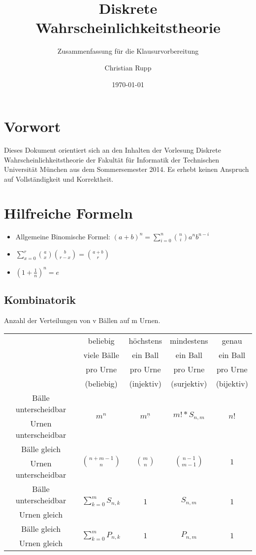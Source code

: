 \documentclass[a4,12pt]{scrartcl}
\title{Diskrete Wahrscheinlichkeitstheorie}
\subtitle{Zusammenfassung für die Klausurvorbereitung}
\author{Christian Rupp}
\date{\today}
\begin{document}
\maketitle

\newpage

\tableofcontents

\section{Vorwort}

Dieses Dokument orientiert sich an den Inhalten der Vorlesung Diskrete Wahrscheinlichkeitstheorie der Fakultät für Informatik der Technischen Universität München aus dem Sommersemester 2014.
Es erhebt keinen Anspruch auf Vollständigkeit und Korrektheit.

\section{Hilfreiche Formeln}

\begin{itemize}
\item Allgemeine Binomische Formel: $(a+b)^n=\sum^n_{i=0}\binom {n}{i}a^nb^{n-i}$
\item $\sum^r_{x=0}\binom{a}{x}\binom{b}{r-x}=\binom{a+b}{r}$
\item $\left(1+\frac{1}{n}\right)^n=e$
\end{itemize}

\subsection{Kombinatorik}
Anzahl der Verteilungen von v Bällen auf m Urnen.\\
\begin{tabular}{|c||c|c|c|c|}
\hline
&beliebig &höchstens &mindestens&genau\\
&viele Bälle&ein Ball& ein Ball& ein Ball\\
& pro Urne& pro Urne& pro Urne& pro Urne\\
& (beliebig)& (injektiv) & (surjektiv)& (bijektiv)\\
\hline
\hline
Bälle unterscheidbar& \multirow{2}{*}{$m^n$} &\multirow{2}{*}{$m^\underline{n}$} &\multirow{2}{*}{$m!*S_{n,m}$} &\multirow{2}{*}{$n!$}\\
Urnen unterscheidbar &&&&\\
\hline
Bälle gleich& \multirow{2}{*}{$\binom{n+m-1}{n}$} &\multirow{2}{*}{$\binom{m}{n}$} &\multirow{2}{*}{$\binom{n-1}{m-1}$} &\multirow{2}{*}{$1$}\\
Urnen unterscheidbar &&&&\\
\hline
Bälle unterscheidbar& \multirow{2}{*}{$\sum^m_{k=0}S_{n,k}$} &\multirow{2}{*}{$1$} &\multirow{2}{*}{$S_{n,m}$} &\multirow{2}{*}{$1$}\\
Urnen gleich &&&&\\
\hline
Bälle gleich& \multirow{2}{*}{$\sum^m_{k=0}P_{n,k}$} &\multirow{2}{*}{$1$} &\multirow{2}{*}{$P_{n,m}$} &\multirow{2}{*}{$1$}\\
Urnen gleich &&&&\\
\hline
\end{tabular}
\end{document}
